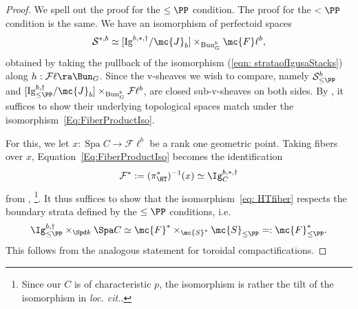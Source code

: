 \documentclass[letterpaper,11pt]{amsart}
\begin{document}
\begin{proof} We spell out the proof for the $\leq \PP$ condition. The proof for the $<\PP$ condition is the same. We have an isomorphism of perfectoid spaces 
\begin{equation}\label{Eq:FiberProductIso}
\mathcal{S}^{*,b} \simeq [\mathrm{Ig}^{b,*,\dagger}/\mc{J}_b]\times_{\mathrm{Bun}_G^b}\mc{F}\ell^b,
\end{equation}
obtained by taking the pullback of the isomorphism (\ref{eqn: strataofIgusaStacks}) along $h: \mathcal{F}\ell \ra \Bun_{G}$. Since the v-sheaves we wish to compare, namely $\mathcal{S}^{b}_{\leq\PP}$ and $[\mathrm{Ig}^{b,\dagger}_{\leq\PP}/\mc{J}_b]\times_{\mathrm{Bun}_G^b}\mathcal{F}\ell^b$, are closed sub-v-sheaves on both sides. By \cite[Proposition 11.20]{Ecod}, it suffices to show their underlying topological spaces match under the isomorphism~\eqref{Eq:FiberProductIso}. 

For this, we let $x:\operatorname{Spa}C\to \mathcal{F}\ell^b$ be a rank one geometric point. Taking fibers over $x$, Equation~\eqref{Eq:FiberProductIso} becomes the identification
\begin{equation}\label{eq: HTfiber}
\mathcal{F}^\ast:=(\pi^\ast_{\HT})^{-1}(x)\simeq \Ig^{b,\ast,\dagger}_C    
\end{equation}
from \cite[Theorem 4.5.1]{CS2}, \cite[Theorem 4.3.9]{santos}\footnote{Since our $C$ is of characteristic $p$, the isomorphism is rather the tilt of the isomorphism in \textit{loc. cit.}.}. It thus suffices to show that the isomorphism~\eqref{eq: HTfiber} respects the boundary strata defined by the $\leq \PP$ conditions, i.e. \begin{equation}\label{Eq: CompareFiberStratum}
\Ig^{b,\dagger}_{\leq \PP} \times_{\Spd k}\Spa C\simeq \mc{F}^\ast\times_{\mc{S}^\ast} \mc{S}_{\leq \PP}=:\mc{F}^\ast_{\leq \PP}.
\end{equation}
This follows from the analogous statement for toroidal compactifications. 


\end{proof}
\end{document}
